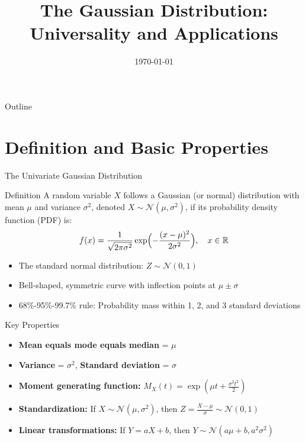 \documentclass{beamer}
\title{The Gaussian Distribution: Universality and Applications}
\author{}
\date{\today}
\begin{document}
\begin{frame}
  \titlepage
\end{frame}

\begin{frame}{Outline}
  \tableofcontents
\end{frame}

\section{Definition and Basic Properties}

\begin{frame}{The Univariate Gaussian Distribution}
  \begin{block}{Definition}
    A random variable $X$ follows a Gaussian (or normal) distribution with mean $\mu$ and variance $\sigma^2$, denoted $X \sim \mathcal{N}(\mu, \sigma^2)$, if its probability density function (PDF) is:
    \[
    f(x) = \frac{1}{\sqrt{2\pi\sigma^2}} \exp\Bigl(-\frac{(x-\mu)^2}{2\sigma^2}\Bigr), \quad x \in \mathbb{R}
    \]
  \end{block}
  
  \begin{itemize}
    \item The standard normal distribution: $Z \sim \mathcal{N}(0,1)$
    \item Bell-shaped, symmetric curve with inflection points at $\mu \pm \sigma$
    \item 68\%-95\%-99.7\% rule: Probability mass within 1, 2, and 3 standard deviations
  \end{itemize}
\end{frame}

\begin{frame}{Key Properties}
  \begin{itemize}
    \item \textbf{Mean equals mode equals median} = $\mu$
    \item \textbf{Variance} = $\sigma^2$, \textbf{Standard deviation} = $\sigma$
    \item \textbf{Moment generating function:} $M_X(t) = \exp(\mu t + \frac{\sigma^2 t^2}{2})$
    \item \textbf{Standardization:} If $X \sim \mathcal{N}(\mu, \sigma^2)$, then $Z = \frac{X-\mu}{\sigma} \sim \mathcal{N}(0,1)$
    \item \textbf{Linear transformations:} If $Y = aX + b$, then $Y \sim \mathcal{N}(a\mu + b, a^2\sigma^2)$
  \end{itemize}
\end{frame}
\end{document}
